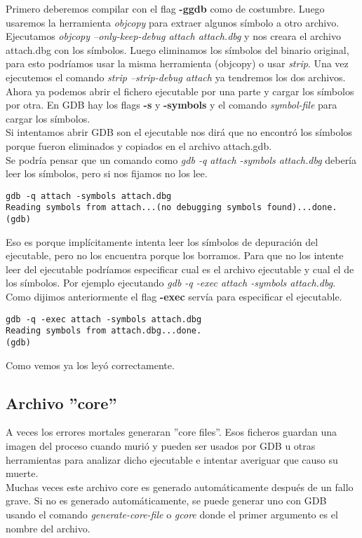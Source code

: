 Primero deberemos compilar con el flag \textbf{-ggdb} como de costumbre. Luego usaremos la herramienta \emph{objcopy} para extraer algunos símbolo a otro archivo. Ejecutamos \emph{objcopy --only-keep-debug attach attach.dbg} y nos creara el archivo attach.dbg con los símbolos. Luego eliminamos los símbolos del binario original, para esto podríamos usar la misma herramienta (objcopy) o usar \emph{strip}. Una vez ejecutemos el comando \emph{strip --strip-debug attach} ya tendremos los dos archivos.\\
Ahora ya podemos abrir el fichero ejecutable por una parte y cargar los símbolos por otra. En GDB hay los flags \textbf{-s} y \textbf{-symbols} y el comando \emph{symbol-file} para cargar los símbolos.\\
Si intentamos abrir GDB son el ejecutable nos dirá que no encontró los símbolos porque fueron eliminados y copiados en el archivo attach.gdb.\\
Se podría pensar que un comando como \emph{gdb -q attach -symbols attach.dbg} debería leer los símbolos, pero si nos fijamos no los lee.
\begin{verbatim}
gdb -q attach -symbols attach.dbg
Reading symbols from attach...(no debugging symbols found)...done.
(gdb)
\end{verbatim}
Eso es porque implícitamente intenta leer los símbolos de depuración del ejecutable, pero no los encuentra porque los borramos. Para que no los intente leer del ejecutable podríamos especificar cual es el archivo ejecutable y cual el de los símbolos. Por ejemplo ejecutando \emph{gdb -q -exec attach -symbols attach.dbg}. Como dijimos anteriormente el flag \textbf{-exec} servía para especificar el ejecutable.
\begin{verbatim}
gdb -q -exec attach -symbols attach.dbg
Reading symbols from attach.dbg...done.
(gdb)
\end{verbatim}
Como vemos ya los leyó correctamente.


\subsection{Archivo ''core''}
A veces los errores mortales generaran ''core files''. Esos ficheros guardan una imagen del proceso cuando murió y pueden ser usados por GDB u otras herramientas para analizar dicho ejecutable e intentar averiguar que causo su muerte. \\
Muchas veces este archivo core es generado automáticamente después de un fallo grave. Si no es generado automáticamente, se puede generar uno con GDB usando el comando \emph{generate-core-file} o \emph{gcore} donde el primer argumento es el nombre del archivo.\\

